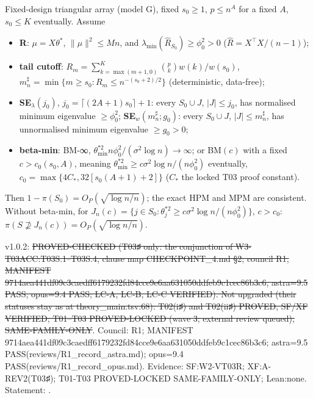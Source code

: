 \begin{theorem}[S-T / T03♯; card TH09]\label{reg:SOP_TH09}
Fixed-design triangular array (model G), fixed $s_0\ge1$, $p\le n^A$ for a fixed $A$, $s_0\le K$ eventually. Assume
\begin{itemize}
\item \textbf{R}: $\mu=X\theta^*$, $\|\mu\|^2\le Mn$, and $\lambda_{\min}(\hat{R}_{S_0})\ge\phi_0^2>0$ ($\hat{R}=X^\top X/(n-1)$);
\item \textbf{tail cutoff}: $R_m=\sum_{k=\max(m+1,0)}^{K}\binom pk w(k)/w(s_0)$, $m^\sharp_n=\min\{m\ge s_0:R_m\le n^{-(s_0+2)/2}\}$ (deterministic, data-free);
\item \textbf{SE$_\lambda(j_0)$}, $j_0=\lceil(2A+1)s_0\rceil+1$: every $S_0\cup J$, $|J|\le j_0$, has normalised minimum eigenvalue $\ge\phi_0^2$; \textbf{SE$_w(m^\sharp_n;g_0)$}: every $S_0\cup J$, $|J|\le m^\sharp_n$, has unnormalised minimum eigenvalue $\ge g_0>0$;
\item \textbf{beta-min}: BM-∞, $\theta^{*2}_{\min}n\phi_0^2/(\sigma^2\log n)\to\infty$; or BM$(c)$ with a fixed $c>c_0(s_0,A)$, meaning $\theta_{\min}^{*2}\ge c\sigma^2\log n/(n\phi_0^2)$ eventually, $c_0=\max\{4C_*,32[s_0(A+1)+2]\}$ ($C_*$ the locked T03 proof constant).
\end{itemize}
Then $1-\pi(S_0)=O_P(\sqrt{\log n/n})$; the exact HPM and MPM are consistent. Without beta-min, for $J_n(c)=\{j\in S_0:\theta_j^{*2}\ge c\sigma^2\log n/(n\phi_0^2)\}$, $c>c_0$: $\pi(S\not\supseteq J_n(c))=O_P(\sqrt{\log n/n})$.
\end{theorem}
\begin{statusbox}
 v1.0.2: \st{PROVED-CHECKED (T03♯ only: the conjunction of W3-T03ACC:T03S.1–T03S.4, clause map CHECKPOINT\_4.md §2; council R1, MANIFEST 9714aea441df09c3caedff6179232fd84cce9e6aa631050ddfeb9c1cec86b3c6, astra=9.5 PASS, opus=9.4 PASS; LC-A, LC-B, LC-C VERIFIED). Not upgraded (their statuses stay as at theory\_main.tsv:68): T02(i♯) and T02(ii♯) PROVED, SF/XF VERIFIED; T01–T03 PROVED-LOCKED (wave 3; external review queued), SAME-FAMILY-ONLY}. Council: R1; MANIFEST 9714aea441df09c3caedff6179232fd84cce9e6aa631050ddfeb9c1cec86b3c6; astra=9.5 PASS(reviews/R1\_record\_astra.md); opus=9.4 PASS(reviews/R1\_record\_opus.md). Evidence: SF:W2-VT03R; XF:A-REV2(T03♯); T01-T03 PROVED-LOCKED SAME-FAMILY-ONLY; Lean:none. Statement: .
\end{statusbox}
